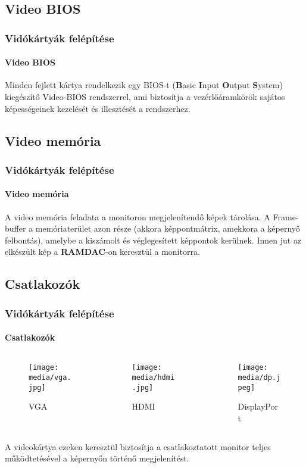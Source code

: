 \documentclass{beamer}
\begin{document}
\subsection{Video BIOS}
\begin{frame}
\frametitle{Vidókártyák felépítése}
\framesubtitle{Video BIOS}
Minden fejlett kártya rendelkezik egy BIOS-t (\textbf{B}asic \textbf{I}nput \textbf{O}utput \textbf{S}ystem) kiegészítő Video-BIOS rendszerrel, ami biztosítja a vezérlőáramkörök sajátos képességeinek kezelését és illesztését a rendszerhez.

\end{frame}

\subsection{Video memória}
\begin{frame}
\frametitle{Vidókártyák felépítése}
\framesubtitle{Video memória}
A video memória feladata a monitoron megjelenítendő képek tárolása. A Frame-buffer a
memóriaterület azon része (akkora képpontmátrix, amekkora a képernyő felbontás),
amelybe a kiszámolt és véglegesített képpontok kerülnek. Innen jut az elkészült kép a
\textbf{RAMDAC}-on keresztül a monitorra.
\end{frame}

\subsection{Csatlakozók}
\begin{frame}
\frametitle{Vidókártyák felépítése}
\framesubtitle{Csatlakozók}

\begin{columns}[onlytextwidth]
\begin{column}{0.3\textwidth}
\begin{figure}
\centering
\texttt{[image: media/vga.jpg]}
\caption{VGA}
\end{figure}
\end{column}

\begin{column}{0.3\textwidth}
\begin{figure}
\centering
\texttt{[image: media/hdmi.jpg]}
\caption{HDMI}
\end{figure}
\end{column}

\begin{column}{0.3\textwidth}
\begin{figure}
\centering
\texttt{[image: media/dp.jpeg]}
\caption{DisplayPort}
\end{figure}
\end{column}

\end{columns}
A
videokártya ezeken keresztül biztosítja a csatlakoztatott monitor teljes működtetésével a
képernyőn történő megjelenítést.
\end{frame}
\end{document}
